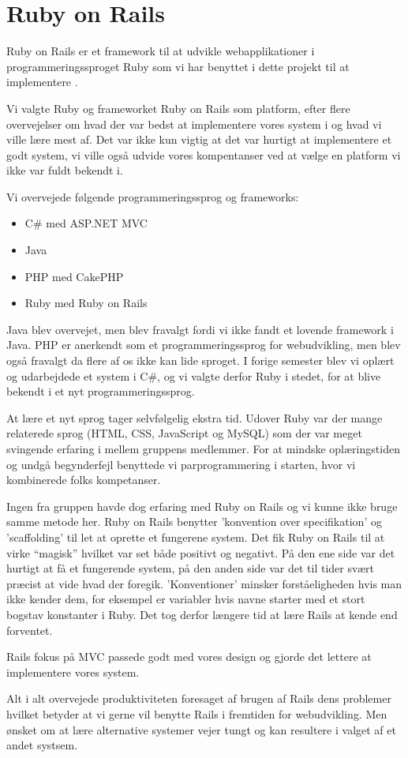 ﻿\chapter{Ruby on Rails}
\label{akademiskror}

Ruby on Rails er et framework til at udvikle webapplikationer i programmeringssproget Ruby som vi har benyttet i dette projekt til at implementere {\Foodl}.

Vi valgte Ruby og frameworket Ruby on Rails som platform, efter flere overvejelser om hvad der var bedst at implementere vores system i og hvad vi ville lære mest af. Det var ikke kun vigtig at det var hurtigt at implementere et godt system, vi ville også udvide vores kompentanser ved at vælge en platform vi ikke var fuldt bekendt i.

Vi overvejede følgende programmeringssprog og frameworks:
\begin{itemize}
\item C\# med ASP.NET MVC
\item Java
\item PHP med CakePHP
\item Ruby med Ruby on Rails
\end{itemize}

Java blev overvejet, men blev fravalgt fordi vi ikke fandt et lovende framework i Java. PHP er anerkendt som et programmeringssprog for webudvikling, men blev også fravalgt da flere af os ikke kan lide sproget. I forige semester blev vi oplært og udarbejdede et system i C\#, og vi valgte derfor Ruby i stedet, for at blive bekendt i et nyt programmeringssprog.

At lære et nyt sprog tager selvfølgelig ekstra tid. Udover Ruby var der mange relaterede sprog (HTML, CSS, JavaScript og MySQL) som der var meget svingende erfaring i mellem gruppens medlemmer. For at mindske oplæringstiden og undgå begynderfejl benyttede vi parprogrammering i starten, hvor vi kombinerede folks kompetanser.

Ingen fra gruppen havde dog erfaring med Ruby on Rails og vi kunne ikke bruge samme metode her. Ruby on Rails benytter 'konvention over specifikation' og 'scaffolding' til let at oprette et fungerene system. Det fik Ruby on Rails til at virke ``magisk'' hvilket var set både positivt og negativt. På den ene side var det hurtigt at få et fungerende system, på den anden side var det til tider svært præcist at vide hvad der foregik. 'Konventioner' minsker forståeligheden hvis man ikke kender dem, for eksempel er variabler hvis navne starter med et stort bogstav konstanter i Ruby. Det tog derfor længere tid at lære Rails at kende end forventet.

Rails fokus på MVC passede godt med vores design og gjorde det lettere at implementere vores system.

Alt i alt overvejede produktiviteten foresaget af brugen af Rails dens problemer hvilket betyder at vi gerne vil benytte Rails i fremtiden for webudvikling. Men ønsket om at lære alternative systemer vejer tungt og kan resultere i valget af et andet systsem.

